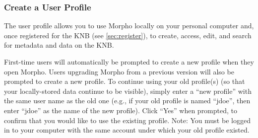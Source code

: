 \subsubsection{Create a User Profile}

The user profile allows you to use Morpho locally on your personal
computer and, once registered for the KNB (see \ref{sec:register}), to
create, access, edit, and search for metadata and data on the KNB. 

First-time users will automatically be prompted to create a new profile
when they open Morpho. Users upgrading Morpho from a previous version
will also be prompted to create a new profile. To continue using your
old profile(s) (so that your locally-stored data continue to be
visible), simply enter a ``new profile'' with the same user name as the
old one (e.g., if your old profile is named ``jdoe'', then enter
``jdoe'' as the name of the new profile). Click ``Yes'' when prompted,
to confirm that you would like to use the existing profile. Note: You
must be logged in to your computer with the same account under which
your old profile existed.

